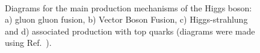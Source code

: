 \begin{figure}[htbp]
    \begin{center}
        \\
        \caption{Diagrams for the main production mechanisms of the Higgs boson: a) gluon gluon fusion, b) Vector Boson Fusion, c) Higgs-strahlung and d) associated production with top quarks (diagrams were made using Ref.~\cite{fey_diag}).}
      \label{fig:higgs_prod_diag}
    \end{center}
  \end{figure}

